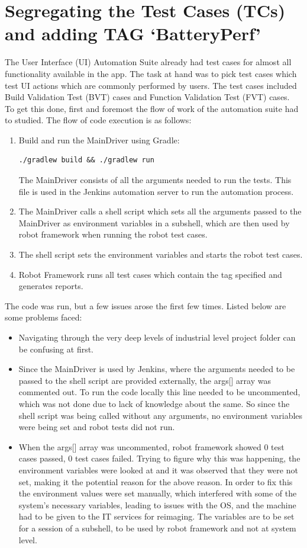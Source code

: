 \section{Segregating the Test Cases (TCs) and adding TAG `BatteryPerf'} The User Interface (UI) Automation Suite already had test cases for almost all functionality available in the app. The task at hand was to pick test cases which test UI actions which are commonly performed by users. The test cases included Build Validation Test (BVT) cases and Function Validation Test (FVT) cases.  \\
To get this done, first and foremost the flow of work of the automation suite had to studied. The flow of code execution is as follows: 
\begin{enumerate}
	\item Build and run the MainDriver using Gradle:
	\begin{lstlisting}[style=ShellStyle]
	./gradlew build && ./gradlew run
	\end{lstlisting}
	The MainDriver consists of all the arguments needed to run the tests. This file is used in the Jenkins automation server to run the automation process.
	\item The MainDriver calls a shell script which sets all the arguments passed to the MainDriver as environment variables in a subshell, which are then used by robot framework when running the robot test cases.
	\item The shell script sets the environment variables and starts the robot test cases.
	\item Robot Framework runs all test cases which contain the tag specified and generates reports.
\end{enumerate}
The code was run, but a few issues arose the first few times. Listed below are some problems faced:
\begin{itemize}
	\item Navigating through the very deep levels of industrial level project folder can be confusing at first.
	\item Since the MainDriver is used by Jenkins, where the arguments needed to be passed to the shell script are provided externally, the args[] array was commented out. To run the code locally this line needed to be uncommented, which was not done due to lack of knowledge about the same. So since the shell script was being called without any arguments, no environment variables were being set and robot tests did not run.
	\item When the args[] array was uncommented, robot framework showed 0 test cases passed, 0 test cases failed. Trying to figure why this was happening, the environment variables were looked at and it was observed that they were not set, making it the potential reason for the above reason. In order to fix this the environment values were set manually, which interfered with some of the system's necessary variables, leading to issues with the OS, and the machine had to be given to the IT services for reimaging. The variables are to be set for a session of a subshell, to be used by robot framework and not at system level.
\end{itemize}

